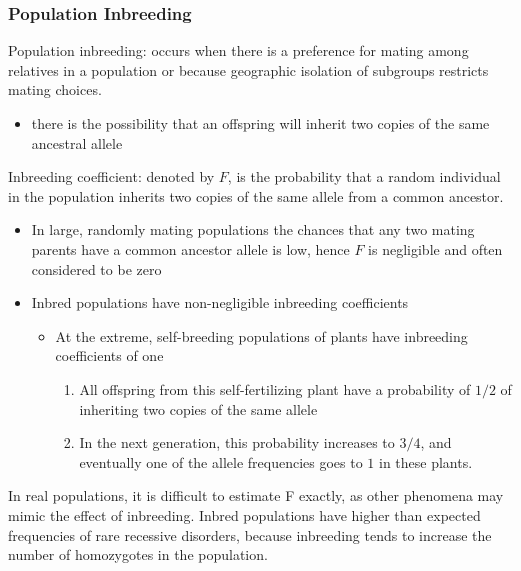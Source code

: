 \documentclass[a4paper,twoside,11pt]{article}
\begin{document}
\subsubsection{Population Inbreeding}
\textcolor{NavyBlue}{Population inbreeding: }occurs when there is a preference for mating among relatives in a population or because geographic isolation of subgroups restricts mating choices.
\begin{itemize}
    \item there is the possibility that an offspring will inherit two copies of the same ancestral allele
\end{itemize}
\textcolor{NavyBlue}{Inbreeding coefficient: }denoted by $F$, is the probability that a random individual in the population inherits two copies of the same allele from a common ancestor.
\begin{itemize}
    \item In large, randomly mating populations the chances that any two mating parents have a common ancestor allele is low, hence $F$ is negligible and often considered to be zero
    \item Inbred populations have non-negligible inbreeding coefficients
    \begin{itemize}
        \item At the extreme, self-breeding populations of plants have inbreeding coefficients of one
        \begin{enumerate}
            \item All offspring from this self-fertilizing plant have a probability of $1/2$ of inheriting two copies of the same allele
            \item In the next generation, this probability increases to $3/4$, and eventually one of the allele frequencies goes to $1$ in these plants.
        \end{enumerate}
    \end{itemize}
\end{itemize}
In real populations, it is difficult to estimate F exactly, as other phenomena may mimic the effect of inbreeding. Inbred populations have higher than expected frequencies of rare recessive disorders, because inbreeding tends to increase the number of homozygotes in the population.
\end{document}
